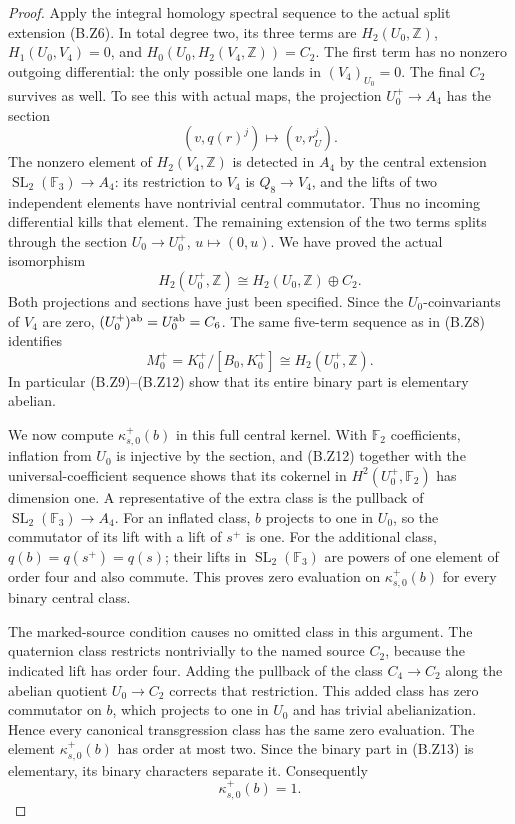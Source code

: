 \begin{proof}
Apply the integral homology spectral sequence to
the actual split extension (B.Z6).  In total degree
two, its three terms are
$H_2(U_0,\mathbb Z)$, $H_1(U_0,V_4)=0$, and
$H_0(U_0,H_2(V_4,\mathbb Z))=C_2$.
The first term has no nonzero outgoing differential:
the only possible one lands in $(V_4)_{U_0}=0$.
The final $C_2$ survives as well.  To see this with
actual maps, the projection $U_0^+\to A_4$ has
the section
\[
                  (v,q(r)^j)\longmapsto(v,r_U^j).
 \tag{B.Z11}
\]
The nonzero element of $H_2(V_4,\mathbb Z)$ is
detected in $A_4$ by the central extension
$\operatorname{SL}_2(\mathbb F_3)\to A_4$:
its restriction to $V_4$ is $Q_8\to V_4$, and
the lifts of two independent elements have
nontrivial central commutator.  Thus no incoming
differential kills that element.  The remaining
extension of the two terms splits through the
section $U_0\to U_0^+$, $u\mapsto(0,u)$.
We have proved the actual isomorphism
\[
 H_2(U_0^+,\mathbb Z)
       \cong H_2(U_0,\mathbb Z)\oplus C_2.
 \tag{B.Z12}
\]
Both projections and sections have just been specified.
Since the $U_0$-coinvariants of $V_4$ are zero,
$(U_0^+)^{\rm ab}=U_0^{\rm ab}=C_6$.
The same five-term sequence as in (B.Z8) identifies
\[
 M_0^+=K_0^+/[B_0,K_0^+]
          \cong H_2(U_0^+,\mathbb Z).
 \tag{B.Z13}
\]
In particular (B.Z9)--(B.Z12) show that its entire
binary part is elementary abelian.

We now compute $\kappa_{s,0}^+(b)$ in this full
central kernel.  With $\mathbb F_2$ coefficients,
inflation from $U_0$ is injective by the section,
and (B.Z12) together with the universal-coefficient
sequence shows that its cokernel in
$H^2(U_0^+,\mathbb F_2)$ has dimension one.
A representative of the extra class is the pullback
of $\operatorname{SL}_2(\mathbb F_3)\to A_4$.
For an inflated class, $b$ projects to one in
$U_0$, so the commutator of its lift with a lift
of $s^+$ is one.  For the additional class,
$q(b)=q(s^+)=q(s)$; their lifts in
$\operatorname{SL}_2(\mathbb F_3)$ are powers of
one element of order four and also commute.
This proves zero evaluation on
$\kappa_{s,0}^+(b)$ for every binary central class.

The marked-source condition causes no omitted class
in this argument.  The quaternion class restricts
nontrivially to the named source $C_2$, because
the indicated lift has order four.  Adding the
pullback of the class $C_4\to C_2$ along the
abelian quotient $U_0\to C_2$ corrects that
restriction.  This added class has zero commutator
on $b$, which projects to one in $U_0$ and has
trivial abelianization.  Hence every canonical
transgression class has the same zero evaluation.
The element $\kappa_{s,0}^+(b)$ has order at most
two.  Since the binary part in (B.Z13) is
elementary, its binary characters separate it.
Consequently
\[
                         \kappa_{s,0}^+(b)=1.
 \tag{B.Z14}
\]


\end{proof}
